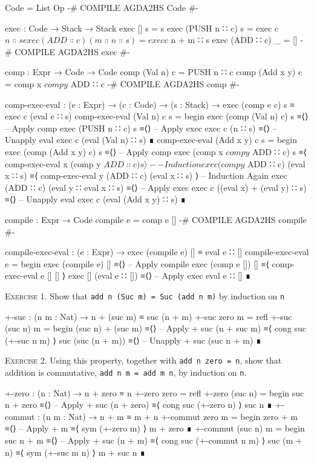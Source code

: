\documentclass{article}
\begin{document}
\begin{code}
Code = List Op
{-# COMPILE AGDA2HS Code #-}

exec : Code → Stack → Stack
exec [] s = s
exec (PUSH n ∷ c) s = exec c $ n ∷ s
exec (ADD ∷ c) (m ∷ n ∷ s) = exec c $ n + m ∷ s
exec (ADD ∷ c) _ = []
{-# COMPILE AGDA2HS exec #-}

comp : Expr → Code → Code
comp (Val n) c = PUSH n ∷ c
comp (Add x y) c = comp x $ comp y $ ADD ∷ c
{-# COMPILE AGDA2HS comp #-}

comp-exec-eval : (e : Expr) → (c : Code) → (s : Stack)
    → exec (comp e c) s ≡ exec c (eval e ∷ s)
comp-exec-eval (Val n) c s =
  begin
    exec (comp (Val n) c) s
  ≡⟨⟩ -- Apply comp
    exec (PUSH n ∷ c) s
  ≡⟨⟩ -- Apply exec
    exec c (n ∷ s)
  ≡⟨⟩ -- Unapply eval
    exec c (eval (Val n) ∷ s)
  ∎
comp-exec-eval (Add x y) c s =
  begin
    exec (comp (Add x y) c) s
  ≡⟨⟩ -- Apply comp
    exec (comp x $ comp y $ ADD ∷ c) s
  ≡⟨ comp-exec-eval x (comp y $ ADD ∷ c) s ⟩ -- Induction
    exec (comp y $ ADD ∷ c) (eval x ∷ s)
  ≡⟨ comp-exec-eval y (ADD ∷ c) (eval x ∷ s) ⟩ -- Induction Again
    exec (ADD ∷ c) (eval y ∷ eval x ∷ s)
  ≡⟨⟩ -- Apply exec
    exec c ((eval x) + (eval y) ∷ s)
  ≡⟨⟩ -- Unapply eval
    exec c (eval (Add x y) ∷ s)
  ∎

compile : Expr → Code
compile e = comp e []
{-# COMPILE AGDA2HS compile #-}

compile-exec-eval : (e : Expr) → exec (compile e) [] ≡ eval e ∷ []
compile-exec-eval e =
  begin
    exec (compile e) []
  ≡⟨⟩ -- Apply compile
    exec (comp e []) []
  ≡⟨ comp-exec-eval e [] [] ⟩
    exec [] (eval e ∷ [])
  ≡⟨⟩ -- Apply exec
    eval e ∷ []
  ∎
\end{code}

\noindent
\textsc{Exercise 1.} Show that \verb!add n (Suc m) = Suc (add n m)! by induction on \texttt{n}

\begin{code}
+-suc : (n m : Nat) → n + (suc m) ≡ suc (n + m)
+-suc zero m = refl
+-suc (suc n) m =
  begin
    (suc n) + (suc m)
  ≡⟨⟩ -- Apply +
    suc (n + suc m)
  ≡⟨ cong suc (+-suc n m) ⟩
    suc (suc (n + m))
  ≡⟨⟩ -- Unapply +
    suc (suc n + m)
  ∎
\end{code}

\noindent
\textsc{Exercise 2.} Using this property, together with \texttt{add n zero = n}, show that addition is commutative, \texttt{add n m = add m n}, by induction on \texttt{n}.

\begin{code}
+-zero : (n : Nat) → n + zero ≡ n
+-zero zero = refl
+-zero (suc n) =
  begin
    suc n + zero
  ≡⟨⟩ -- Apply +
    suc (n + zero)
  ≡⟨ cong suc (+-zero n) ⟩
    suc n
  ∎
+-commut : (n m : Nat) → n + m ≡ m + n
+-commut zero m =
  begin
    zero + m
  ≡⟨⟩ -- Apply +
    m
  ≡⟨ sym (+-zero m) ⟩
    m + zero
  ∎
+-commut (suc n) m =
  begin
    suc n + m
  ≡⟨⟩ -- Apply +
    suc (n + m)
  ≡⟨ cong suc (+-commut n m) ⟩
    suc (m + n)
  ≡⟨ sym (+-suc m n) ⟩
    m + suc n
  ∎
\end{code}
\end{document}
